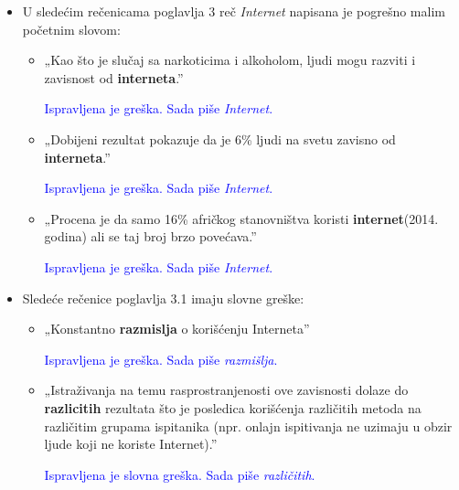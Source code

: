 \documentclass[a4paper]{report}
\newcommand{\odgovor}[1]{\textcolor{blue}{#1}}
\begin{document}
\begin{itemize}
    \item U sledećim rečenicama poglavlja 3 reč \textit{Internet} napisana je pogrešno malim početnim slovom:\newline
    \begin{itemize}
        \item  „Kao što je slučaj sa narkoticima i alkoholom, ljudi mogu razviti i zavisnost od \textbf{interneta}.”
        
        \odgovor{Ispravljena je greška. Sada piše \textit{Internet}.}
        
    \end{itemize}
    \begin{itemize}
        \item „Dobijeni rezultat pokazuje da je 6\% ljudi na svetu zavisno od \textbf{interneta}.”
        
        \odgovor{Ispravljena je greška. Sada piše \textit{Internet}.}
        
        
    \end{itemize}
    \begin{itemize}
        \item  „Procena je da samo 16\% afričkog stanovništva koristi \textbf{internet}(2014. godina) ali se taj broj brzo povećava.”
        
        \odgovor{Ispravljena je greška. Sada piše \textit{Internet}.}
        
    \end{itemize}
\end{itemize}
\begin{itemize}
    \item  Sledeće rečenice poglavlja 3.1 imaju slovne greške:
    
    \odgovor{}
    
    \begin{itemize}
        \item „Konstantno \textbf{razmislja} o korišćenju Interneta”
        
        \odgovor{Ispravljena je greška. Sada piše \textit{razmišlja}.}
        
    \end{itemize}
    \begin{itemize}
        \item „Istraživanja na temu rasprostranjenosti ove zavisnosti dolaze do 
        \textbf{razlicitih} rezultata što je posledica korišćenja različitih metoda na različitim grupama ispitanika (npr. onlajn ispitivanja ne uzimaju u obzir ljude koji ne koriste Internet).”
        
        \odgovor{Ispravljena je slovna greška. Sada piše \textit{različitih}.}
        
    \end{itemize}
\end{itemize}
\end{document}
